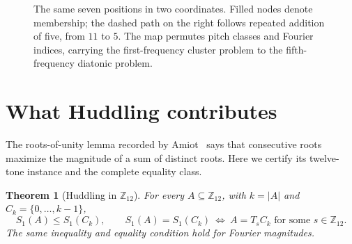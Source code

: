 \documentclass[11pt]{article}
\newtheorem{theorem}{Theorem}
\newcommand{\Ztwelve}{\mathbb{Z}_{12}}
\begin{document}
\begin{figure}[!htb]\centering
{}
\caption{The same seven positions in two coordinates. Filled nodes denote membership;
the dashed path on the right follows repeated addition of five, from $11$ to $5$.
The map permutes pitch classes and Fourier indices, carrying the first-frequency
cluster problem to the fifth-frequency diatonic problem.}
\label{fig:clocks}
\end{figure}

\section{What Huddling contributes}\label{sec:huddling}

The roots-of-unity lemma recorded by Amiot~\cite[Lemma~2]{Amiot2009} says that consecutive
roots maximize the magnitude of a sum of distinct roots. Here we certify its
twelve-tone instance and the complete equality class.

\begin{theorem}[Huddling in $\Ztwelve$]\label{thm:huddling}
For every $A\subseteq\Ztwelve$, with $k=|A|$ and $C_k=\{0,\ldots,k-1\}$,
\[
 S_1(A)\le S_1(C_k),\qquad
 S_1(A)=S_1(C_k)\ \Longleftrightarrow\ A=T_sC_k\text{ for some }s\in\Ztwelve.
\]
The same inequality and equality condition hold for Fourier magnitudes.
\end{theorem}
\end{document}
